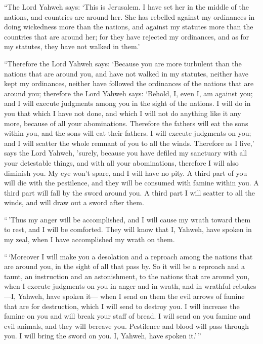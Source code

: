  ``The Lord Yahweh says: `This is Jerusalem. I have set
her in the middle of the nations, and countries are around her.
 She has rebelled against my ordinances in doing
wickedness more than the nations, and against my statutes more than the
countries that are around her; for they have rejected my ordinances, and
as for my statutes, they have not walked in them.'

 ``Therefore the Lord Yahweh says: `Because you are more
turbulent than the nations that are around you, and have not walked in
my statutes, neither have kept my ordinances, neither have followed the
ordinances of the nations that are around you;  therefore
the Lord Yahweh says: `Behold, I, even I, am against you; and I will
execute judgments among you in the sight of the nations. 
I will do in you that which I have not done, and which I will not do
anything like it any more, because of all your abominations.
 Therefore the fathers will eat the sons within you, and
the sons will eat their fathers. I will execute judgments on you; and I
will scatter the whole remnant of you to all the winds. 
Therefore as I live,' says the Lord Yahweh, 'surely, because you have
defiled my sanctuary with all your detestable things, and with all your
abominations, therefore I will also diminish you. My eye won't spare,
and I will have no pity.  A third part of you will die
with the pestilence, and they will be consumed with famine within you. A
third part will fall by the sword around you. A third part I will
scatter to all the winds, and will draw out a sword after them.

 ``\,'Thus my anger will be accomplished, and I will
cause my wrath toward them to rest, and I will be comforted. They will
know that I, Yahweh, have spoken in my zeal, when I have accomplished my
wrath on them.

 ``\,`Moreover I will make you a desolation and a
reproach among the nations that are around you, in the sight of all that
pass by.  So it will be a reproach and a taunt, an
instruction and an astonishment, to the nations that are around you,
when I execute judgments on you in anger and in wrath, and in wrathful
rebukes---I, Yahweh, have spoken it---  when I send on
them the evil arrows of famine that are for destruction, which I will
send to destroy you. I will increase the famine on you and will break
your staff of bread.  I will send on you famine and evil
animals, and they will bereave you. Pestilence and blood will pass
through you. I will bring the sword on you. I, Yahweh, have spoken
it.'\,''

